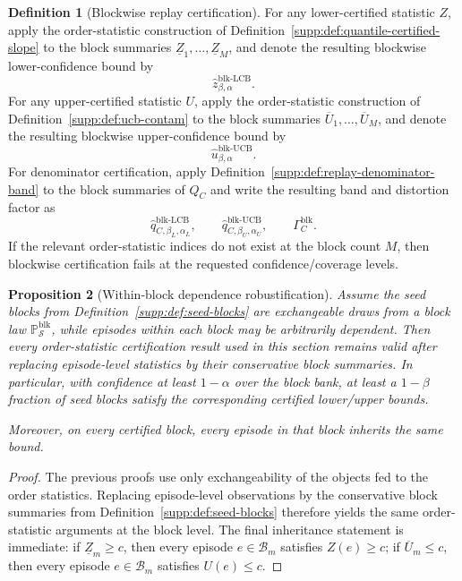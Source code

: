 \documentclass[11pt]{article}
\newcommand{\Prob}{\mathbb{P}}
\newcommand{\1}{\mathbf{1}}
\theoremstyle{definition}
\newtheorem{definition}{Definition}[section]
\theoremstyle{plain}
\newtheorem{proposition}[definition]{Proposition}
\theoremstyle{remark}
\begin{document}
\begin{definition}[Blockwise replay certification]
\label{supp:def:blockwise-cert}
For any lower-certified statistic $Z$, apply the order-statistic construction of Definition~\ref{supp:def:quantile-certified-slope} to the block summaries $\underline Z_1,\dots,\underline Z_M$, and denote the resulting blockwise lower-confidence bound by
\[
\widehat z^{\mathrm{blk\textrm{-}LCB}}_{\beta,\alpha}.
\]
For any upper-certified statistic $U$, apply the order-statistic construction of Definition~\ref{supp:def:ucb-contam} to the block summaries $\overline U_1,\dots,\overline U_M$, and denote the resulting blockwise upper-confidence bound by
\[
\widehat u^{\mathrm{blk\textrm{-}UCB}}_{\beta,\alpha}.
\]
For denominator certification, apply Definition~\ref{supp:def:replay-denominator-band} to the block summaries of $Q_C$ and write the resulting band and distortion factor as
\[
\widehat q_{C,\beta_L,\alpha_L}^{\mathrm{blk\textrm{-}LCB}},
\qquad
\widehat q_{C,\beta_U,\alpha_U}^{\mathrm{blk\textrm{-}UCB}},
\qquad
\Gamma_C^{\mathrm{blk}}.
\]
If the relevant order-statistic indices do not exist at the block count $M$, then blockwise certification fails at the requested confidence/coverage levels.
\end{definition}

\begin{proposition}[Within-block dependence robustification]
\label{supp:prop:block-robust}
Assume the seed blocks from Definition~\ref{supp:def:seed-blocks} are exchangeable draws from a block law $\Prob_{\mathcal S}^{\mathrm{blk}}$, while episodes within each block may be arbitrarily dependent. Then every order-statistic certification result used in this section remains valid after replacing episode-level statistics by their conservative block summaries. In particular, with confidence at least $1-\alpha$ over the block bank, at least a $1-\beta$ fraction of seed blocks satisfy the corresponding certified lower/upper bounds.

Moreover, on every certified block, every episode in that block inherits the same bound.
\end{proposition}

\begin{proof}
The previous proofs use only exchangeability of the objects fed to the order statistics. Replacing episode-level observations by the conservative block summaries from Definition~\ref{supp:def:seed-blocks} therefore yields the same order-statistic arguments at the block level. The final inheritance statement is immediate: if $\underline Z_m\ge c$, then every episode $e\in \mathcal B_m$ satisfies $Z(e)\ge c$; if $\overline U_m\le c$, then every episode $e\in \mathcal B_m$ satisfies $U(e)\le c$.
\end{proof}
\end{document}
